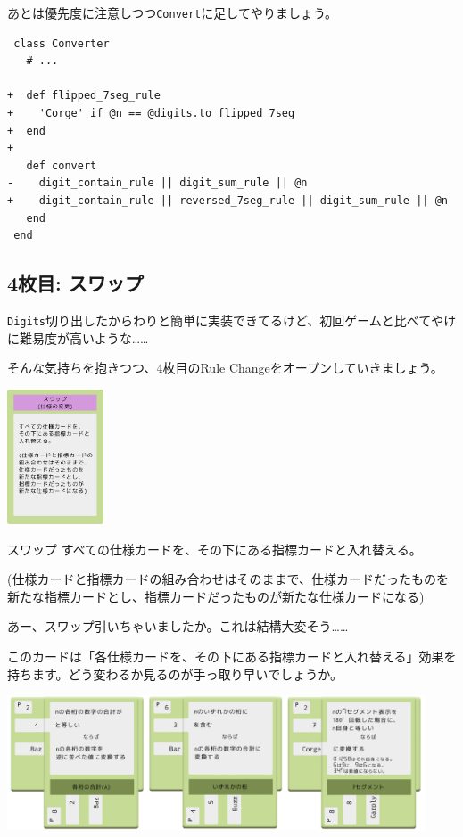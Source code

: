 \documentclass[index]{subfiles}
\begin{document}
あとは優先度に注意しつつ\verb+Convert+に足してやりましょう。

\begin{lstlisting}
 class Converter
   # ...

+  def flipped_7seg_rule
+    'Corge' if @n == @digits.to_flipped_7seg
+  end
+  
   def convert
-    digit_contain_rule || digit_sum_rule || @n
+    digit_contain_rule || reversed_7seg_rule || digit_sum_rule || @n
   end
 end
\end{lstlisting}

  \subsection{4枚目: スワップ}

\verb+Digits+切り出したからわりと簡単に実装できてるけど、初回ゲームと比べてやけに難易度が高いような……

そんな気持ちを抱きつつ、4枚目のRule Changeをオープンしていきましょう。

\begin{center}
  \includegraphics[height=4cm]{image/214_replay_2_4.png}
\end{center}

\begin{itembox}[l]{スワップ}
すべての仕様カードを、その下にある指標カードと入れ替える。

(仕様カードと指標カードの組み合わせはそのままで、仕様カードだったものを新たな指標カードとし、指標カードだったものが新たな仕様カードになる)
\end{itembox}

あー、スワップ引いちゃいましたか。これは結構大変そう……

このカードは「各仕様カードを、その下にある指標カードと入れ替える」効果を持ちます。どう変わるか見るのが手っ取り早いでしょうか。

\begin{center}
  \includegraphics[height=4cm]{image/215_replay_2_5.png}
\end{center}
\end{document}
